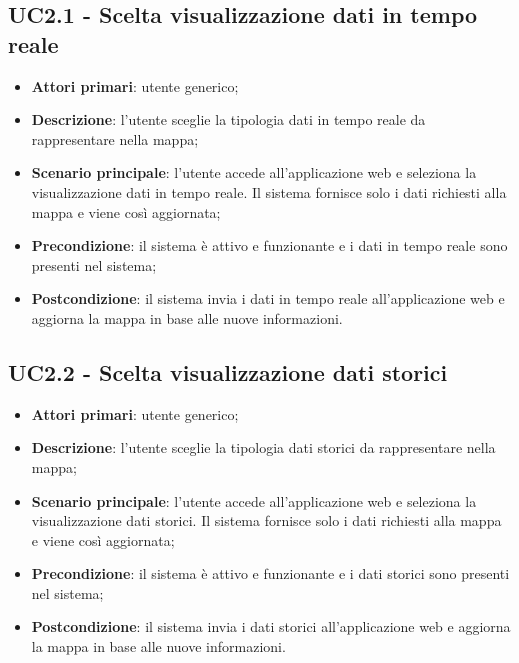 \subsection{UC2.1 - Scelta visualizzazione dati in tempo reale}
\begin{itemize}
	\item \textbf{Attori primari}: utente generico;
	\item \textbf{Descrizione}: l'utente sceglie la tipologia dati in tempo reale da rappresentare nella mappa;
	\item \textbf{Scenario principale}: l'utente accede all'applicazione web e seleziona la visualizzazione dati in tempo reale. Il sistema fornisce solo i dati richiesti alla mappa e viene così aggiornata;
	\item \textbf{Precondizione}: il sistema è attivo e funzionante e i dati in tempo reale sono presenti nel sistema;
	\item \textbf{Postcondizione}: il sistema invia i dati in tempo reale all'applicazione web e aggiorna la mappa in base alle nuove informazioni.
\end{itemize}

\subsection{UC2.2 - Scelta visualizzazione dati storici}
\begin{itemize}
	\item \textbf{Attori primari}: utente generico;
	\item \textbf{Descrizione}: l'utente sceglie la tipologia dati storici da rappresentare nella mappa;
	\item \textbf{Scenario principale}: l'utente accede all'applicazione web e seleziona la visualizzazione dati storici. Il sistema fornisce solo i dati richiesti alla mappa e viene così aggiornata;
	\item \textbf{Precondizione}: il sistema è attivo e funzionante e i dati storici sono presenti nel sistema;
	\item \textbf{Postcondizione}: il sistema invia i dati storici all'applicazione web e aggiorna la mappa in base alle nuove informazioni.
\end{itemize}

